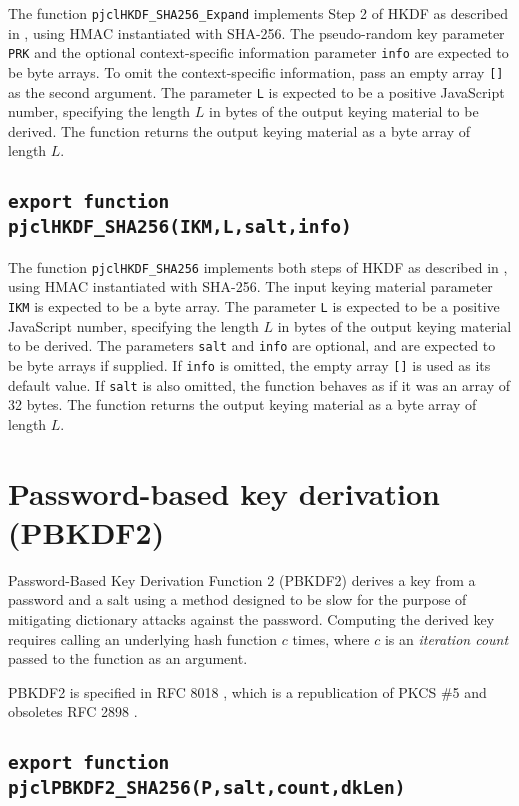 \documentclass[12pt]{article}
\begin{document}
The function {\tt pjclHKDF\_SHA256\_Expand} implements Step 2 of HKDF as described in 
\cite{RFC5869}, using HMAC instantiated with SHA-256.  The pseudo-random
key parameter {\tt PRK} and the optional context-specific information parameter {\tt info} 
are expected to be byte arrays.  To omit the context-specific information, pass an empty array
{\tt []} as the second argument.  The parameter {\tt L} is expected to be
a positive JavaScript number, specifying the length $L$ in bytes of the output keying material 
to be derived.  The function returns the output keying material as a byte array of length $L$.

\subsection{\tt export function pjclHKDF\_SHA256(IKM,L,salt,info)}

The function {\tt pjclHKDF\_SHA256} implements both steps of HKDF as described in 
\cite{RFC5869}, using HMAC instantiated with SHA-256.  The 
input keying material parameter {\tt IKM} is expected to be a byte array.  The
parameter {\tt L} is expected to be a positive JavaScript number, specifying the 
length $L$ in bytes of the output keying material to be derived.  The parameters 
{\tt salt} and {\tt info} are optional, and are expected to be byte arrays if supplied.
If {\tt info} is omitted, the empty array {\tt []} is used as its default value. 
If {\tt salt} is also omitted, the function behaves as if it was an array of 32 bytes.
The function returns the output keying material as a byte array of length $L$.

\section{Password-based key derivation (PBKDF2)}

Password-Based Key Derivation Function 2 (PBKDF2) derives a key
from a password and a salt using a method designed to be
slow for the purpose of mitigating dictionary attacks against the password.
Computing the derived key requires calling an underlying hash function $c$ times, where 
$c$ is an {\em iteration count\/} passed to the function as an argument.

PBKDF2 is specified in RFC 8018 \cite{RFC8018}, which is a republication of
PKCS \#5 and obsoletes RFC 2898 \cite{RFC2898}.

\subsection{\tt export function pjclPBKDF2\_SHA256(P,salt,count,dkLen)}
\end{document}
